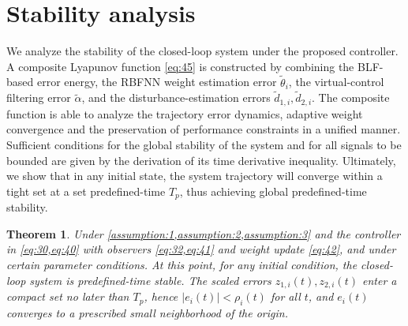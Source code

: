 \documentclass[pdflatex,sn-mathphys-num]{sn-jnl}%
\theoremstyle{thmstyleone}%
\newtheorem{theorem}{Theorem}%
\theoremstyle{thmstyletwo}%
\theoremstyle{thmstylethree}%
\begin{document}
\section{Stability analysis}

 We analyze the stability of the closed-loop system under the proposed controller.  A composite Lyapunov function \cref{eq:45} is constructed by combining the BLF-based error energy, the RBFNN weight estimation error $\tilde \theta_{i}$, the virtual-control filtering error $\tilde\alpha$, and the disturbance-estimation errors $\tilde d_{1,i},\tilde d_{2,i}$. The composite function is able to analyze the trajectory error dynamics, adaptive weight convergence and the preservation of performance constraints in a unified manner. Sufficient conditions for the global stability of the system and for all signals to be bounded are given by the derivation of its time derivative inequality. Ultimately, we show that in any initial state, the system trajectory will converge within a tight set at a set predefined-time $T_p$, thus achieving global predefined-time stability.

 \begin{theorem}
	Under \cref{assumption:1,assumption:2,assumption:3} and the controller in \cref{eq:30,eq:40} with observers \cref{eq:32,eq:41} and weight update \cref{eq:42}, and under certain parameter conditions. At this point, for any initial condition, the closed-loop system is predefined-time stable. The scaled errors $z_{1,i}(t),z_{2,i}(t)$ enter a compact set no later than $T_p$, hence $|e_{i}(t)|<\rho_{i}(t)$ for all $t$, and $e_i(t)$ converges to a prescribed small neighborhood of the origin.
\end{theorem}
\end{document}
